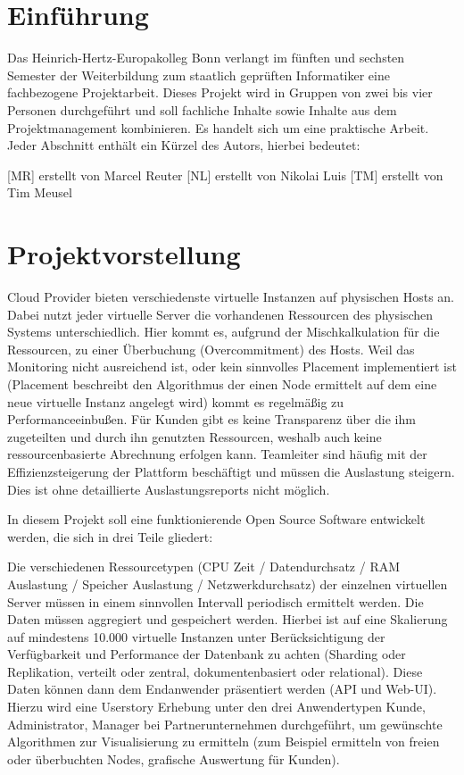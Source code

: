 \section{Einführung}
Das Heinrich-Hertz-Europakolleg Bonn verlangt im fünften und sechsten Semester
der Weiterbildung zum staatlich geprüften Informatiker eine fachbezogene
Projektarbeit. Dieses Projekt wird in Gruppen von zwei bis vier Personen
durchgeführt und soll fachliche Inhalte sowie Inhalte aus dem Projektmanagement
kombinieren. Es handelt sich um eine praktische Arbeit. Jeder Abschnitt enthält
ein Kürzel des Autors, hierbei bedeutet:

\begin{outline}
  \1 {[MR]} erstellt von Marcel Reuter
  \1 {[NL]} erstellt von Nikolai Luis
  \1 {[TM]} erstellt von Tim Meusel
\end{outline}
\tm%

\section{Projektvorstellung}
\label{subsubsec:projektvorstellung}
Cloud Provider bieten verschiedenste virtuelle Instanzen auf physischen Hosts
an. Dabei nutzt jeder virtuelle Server die vorhandenen Ressourcen des
physischen Systems unterschiedlich. Hier kommt es, aufgrund der
Mischkalkulation für die Ressourcen, zu einer Überbuchung (Overcommitment) des
Hosts. Weil das Monitoring nicht ausreichend ist, oder kein sinnvolles
Placement implementiert ist (Placement beschreibt den Algorithmus der einen
Node ermittelt auf dem eine neue virtuelle Instanz angelegt wird) kommt es
regelmäßig zu Performanceeinbußen. Für Kunden gibt es keine Transparenz über
die ihm zugeteilten und durch ihn genutzten Ressourcen, weshalb auch keine
ressourcenbasierte Abrechnung erfolgen kann. Teamleiter sind häufig mit der
Effizienzsteigerung der Plattform beschäftigt und müssen die Auslastung
steigern. Dies ist ohne detaillierte Auslastungsreports nicht möglich.

In diesem Projekt soll eine funktionierende Open Source Software entwickelt
werden, die sich in drei Teile gliedert:

\begin{outline}
  \1 Die verschiedenen Ressourcetypen (CPU Zeit / Datendurchsatz / RAM
  Auslastung / Speicher Auslastung / Netzwerkdurchsatz) der einzelnen
  virtuellen Server müssen in einem sinnvollen Intervall periodisch ermittelt
  werden.
  \1 Die Daten müssen aggregiert und gespeichert werden. Hierbei ist auf eine
  Skalierung auf mindestens 10.000 virtuelle Instanzen unter Berücksichtigung
  der Verfügbarkeit und Performance der Datenbank zu achten (Sharding oder
  Replikation, verteilt oder zentral, dokumentenbasiert oder relational).
  \1 Diese Daten können dann dem Endanwender präsentiert werden (\gls{API} und
  Web-UI). Hierzu wird eine Userstory Erhebung unter den drei Anwendertypen
  Kunde, Administrator, Manager bei Partnerunternehmen durchgeführt, um
  gewünschte Algorithmen zur Visualisierung zu ermitteln (zum Beispiel
  ermitteln von freien oder überbuchten Nodes, grafische Auswertung für Kunden).
\end{outline}

